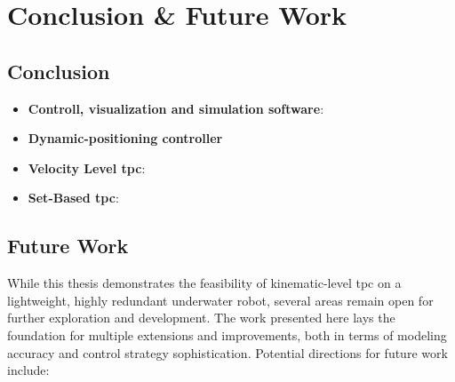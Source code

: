 \chapter{Conclusion \& Future Work}
\label{ch:conclusion}

\section{Conclusion}

\begin{itemize}
    \item \textbf{Controll, visualization and simulation software}:
    \item \textbf{Dynamic-positioning controller}
    \item \textbf{Velocity Level \gls{tpc}}:
    \item \textbf{Set-Based \gls{tpc}}:
\end{itemize}

\section{Future Work}
\label{sec:conclusion:future_work}

While this thesis demonstrates the feasibility of kinematic-level \gls{tpc} on a lightweight, highly redundant underwater robot, several areas remain open for further exploration and development. The work presented here lays the foundation for multiple extensions and improvements, both in terms of modeling accuracy and control strategy sophistication. Potential directions for future work include:

